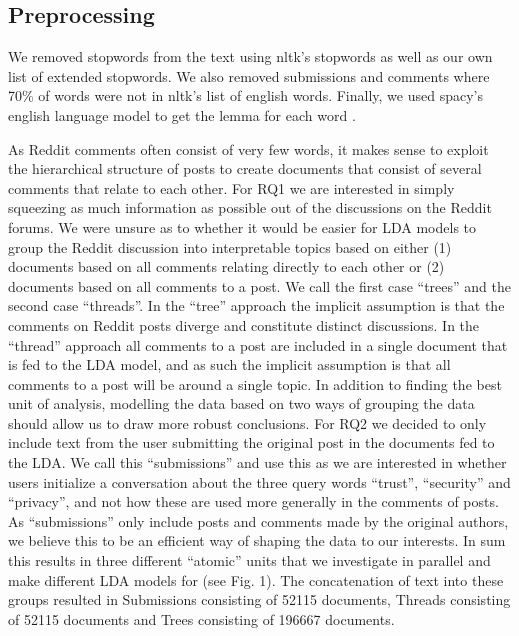 \documentclass{article}
\begin{document}
    \subsection{Preprocessing}
    We removed stopwords from the text using nltk’s \cite{loper2002nltk} stopwords as well as our own list of extended stopwords. We also removed submissions and comments where 70\% of words were not in nltk’s list of english words. Finally, we used spacy’s \cite{spacy2} english language model to get the lemma for each word . 

As Reddit comments often consist of very few words, it makes sense to exploit the hierarchical structure of posts to create documents that consist of several comments that relate to each other. For RQ1 we are interested in simply squeezing as much information as possible out of the discussions on the Reddit forums. We were unsure as to whether it would be easier for LDA models to group the Reddit discussion into interpretable topics based on either (1) documents based on all comments relating directly to each other or (2) documents based on all comments to a post. We call the first case “trees” and the second case “threads”. In the “tree” approach the implicit assumption is that the comments on Reddit posts diverge and constitute distinct discussions. In the “thread” approach all comments to a post are included in a single document that is fed to the LDA model, and as such the implicit assumption is that all comments to a post will be around a single topic. In addition to finding the best unit of analysis, modelling the data based on two ways of grouping the data should allow us to draw more robust conclusions. 
For RQ2 we decided to only include text from the user submitting the original post in the documents fed to the LDA. We call this “submissions” and use this as we are interested in whether users initialize a conversation about the three query words “trust”, “security” and “privacy”, and not how these are used more generally in the comments of posts. As “submissions” only include posts and comments made by the original authors, we believe this to be an efficient way of shaping the data to our interests. In sum this results in three different “atomic” units that we investigate in parallel and make different LDA models for (see Fig. 1). The concatenation of text into these groups resulted in Submissions consisting of 52115 documents, Threads consisting of 52115 documents and Trees consisting of 196667 documents. 
\end{document}
